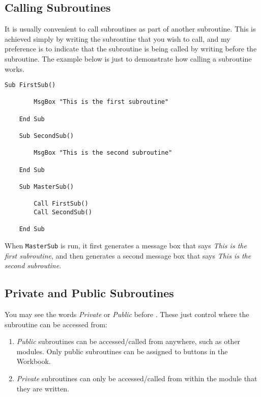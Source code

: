 \documentclass[11pt]{article}%
\begin{document}

\subsection{Calling Subroutines}

It is usually convenient to call subroutines as part of another subroutine. This is achieved simply by writing the subroutine that you wish to call, and my preference is to indicate that the subroutine is being called by writing  before the subroutine. The example below is just to demonstrate how calling a subroutine works.\\

\begin{lstlisting}[style=A]
    Sub FirstSub()

        MsgBox "This is the first subroutine"

    End Sub

    Sub SecondSub()

        MsgBox "This is the second subroutine"

    End Sub

    Sub MasterSub()

        Call FirstSub()
        Call SecondSub()

    End Sub
\end{lstlisting}

When \texttt{MasterSub} is run, it first generates a message box that says \textit{This is the first subroutine}, and then generates a second message box that says \textit{This is the second subroutine}.


\subsection{Private and Public Subroutines}

You may see the words \textit{Private} or \textit{Public} before . These just control where the subroutine can be accessed from:
\begin{enumerate}
    \item \textit{Public} subroutines can be accessed/called from anywhere, such as other modules. Only public subroutines can be assigned to buttons in the Workbook.
    \item \textit{Private} subroutines can only be accessed/called from within the module that they are written.
\end{enumerate}
\end{document}
